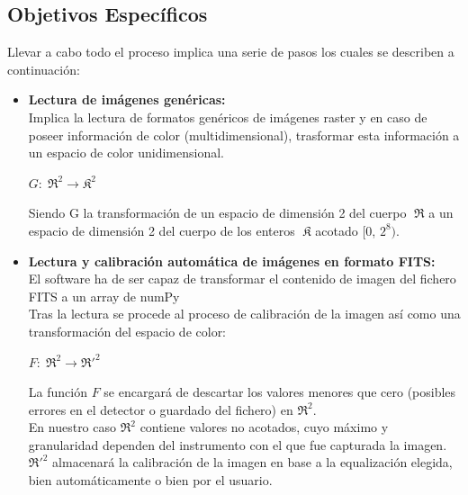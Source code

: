 	\subsection{Objetivos Específicos}
	Llevar a cabo todo el proceso implica una serie de pasos los cuales se describen a continuación:
	\begin{itemize}
		\item \textbf{Lectura de imágenes genéricas:}\\
		Implica la lectura de formatos genéricos de imágenes raster y en caso de poseer información de color (multidimensional), trasformar esta información a un espacio de color unidimensional.
		\begin{center}
		{\large $G:\mathfrak{\;R^{2}\rightarrow\mathfrak{K^{2}}}$}
		\end{center}
		Siendo G la transformación de un espacio de dimensión 2 del cuerpo $\mathfrak{\;R}$ a un espacio de dimensión 2 del cuerpo de los enteros $\mathfrak{\;K}$ acotado {[}0, $2^{8})$.
		
		\item \textbf{Lectura y calibración automática de imágenes en formato FITS:}\\
		El software ha de ser capaz de transformar el contenido de imagen del fichero FITS a un array de numPy \\
		Tras la lectura se procede al proceso de calibración de la imagen así como una transformación del espacio de color:

		\begin{center}
		{\large 	$F:\mathfrak{\;\mathfrak{R^{2}}\rightarrow\mathfrak{\mathfrak{R'}^{2}}}$}
		\end{center}
		La función $F$ se encargará de descartar los valores menores que cero (posibles errores en el detector o guardado del fichero) en $\mathfrak{R^{2}}$.\\
		En nuestro caso $\mathfrak{R^{2}}$ contiene valores no acotados, cuyo máximo y granularidad dependen del instrumento con el que fue capturada la imagen.\\
		$\mathfrak{R'}^{2}$ almacenará la calibración de la imagen en base a la equalización elegida, bien automáticamente o bien por el usuario.


\end{itemize}
